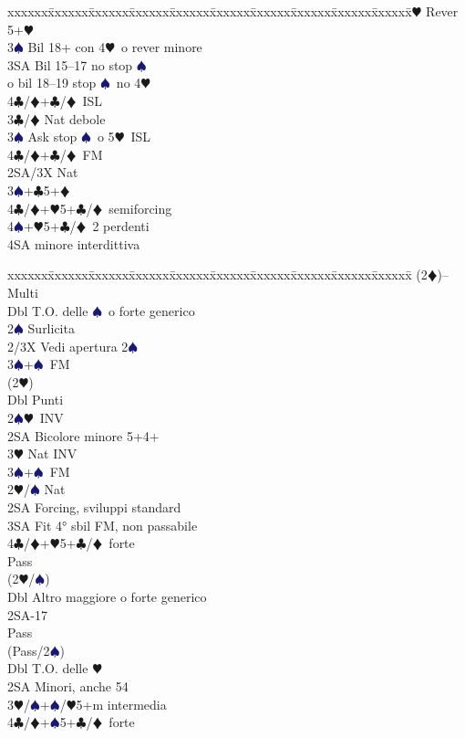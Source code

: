\documentclass[a4paper,italian]{article}
\newcommand{\BC}{\textcolor{OliveGreen}{$\clubsuit$}}
\newcommand{\BD}{\textcolor{RedOrange}{$\vardiamondsuit$}}
\newcommand{\BH}{\textcolor{Red2}{$\varheartsuit${}}}
\newcommand{\BS}{\textcolor{MidnightBlue}{$\spadesuit${}}}
\newenvironment{bidtable}
{\begin{tabbing}

    xxxxxx\=xxxxxx\=xxxxxx\=xxxxxx\=xxxxxx\=xxxxxx\=xxxxxx\=xxxxxx\=xxxxxx\=xxxxxx\=\kill}
{\end{tabbing} }%
\begin{document}
\begin{multicols}{2}
\begin{bidtable}
        3\BH\> Rever 5+\BH\\
        3\BS\> Bil 18+ con 4\BH\ o rever minore\\
        3SA\> Bil 15--17 no stop \BS\+\\o bil 18--19 stop \BS\ no 4\BH\-\\
        4\BC/\BD{}+\BC/\BD\ ISL\-\\
        3\BC/\BD\> Nat debole\\
        3\BS\> Ask stop \BS\ o 5\BH\ ISL\\
        4\BC/\BD{}+\BC/\BD\ FM\-\\
        2SA/3X\>\> Nat\\
        3\BS{}+\BC5+\BD\\
        4\BC/\BD{}+\BH5+\BC/\BD\ semiforcing\\
        4\BS{}+\BH5+\BC/\BD\ 2 perdenti\\
        4SA minore interdittiva
    \end{bidtable}
    \begin{bidtable}
        (2\BD)--\> Multi\+\\
        Dbl\> T.O. delle \BS\ o forte generico\+\\
        2\BS\> Surlicita\\
        2/3X \> Vedi apertura 2\BS\\
        3\BS{}+\BS\ FM\\
        (2\BH)\+\\
        Dbl\> Punti\\
        2\BS{}\BH\ INV\\
        2SA\> Bicolore minore 5+4+\\
        3\BH\> Nat INV\\
        3\BS{}+\BS\ FM\-\-\\
        2\BH/\BS\> Nat\+\\
        2SA\> Forcing, sviluppi standard\\
        3SA\> Fit 4° sbil FM, non passabile\-\\
        4\BC/\BD{}+\BH5+\BC/\BD\ forte\\
        Pass\+\\
        (2\BH/\BS)\+\\
        Dbl\> Altro maggiore o forte generico\\
        2SA-17\\
        Pass\+\\
        (Pass/2\BS)\+\\
        Dbl\> T.O. delle \BH\\
        2SA\> Minori, anche 54\\
        3\BH/\BS{}+\BS/\BH5+m intermedia\\
        4\BC/\BD{}+\BS5+\BC/\BD\ forte\\


\end{bidtable}
\end{multicols}
\end{document}
